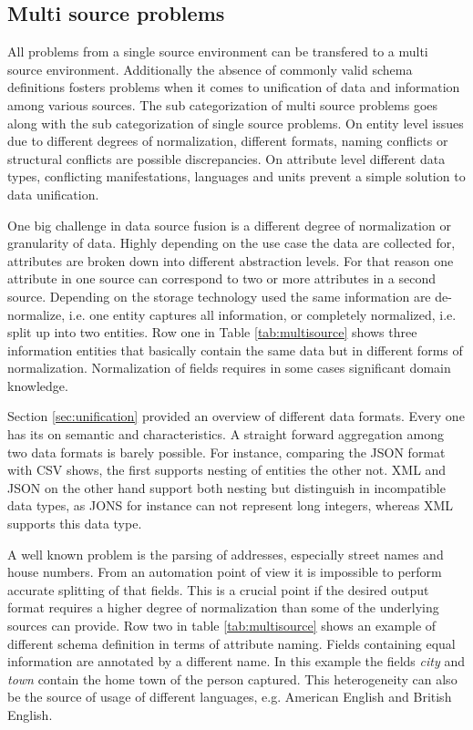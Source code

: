 \subsection{Multi source problems}
All problems from a single source environment can be transfered to a multi source environment. Additionally the absence of commonly valid schema definitions fosters problems when it comes to unification of data and information among various sources. The sub categorization of multi source problems goes along with the sub categorization of single source problems. On entity level issues due to different degrees of normalization, different formats, naming conflicts or structural conflicts are possible discrepancies. On attribute level different data types, conflicting manifestations, languages and units prevent a simple solution to data unification.

One big challenge in data source fusion is a different degree of normalization or granularity of data. Highly depending on the use case the data are collected for, attributes are broken down into different abstraction levels. For that reason one attribute in one source can correspond to two or more attributes in a second source. Depending on the storage technology used the same information are de-normalize, i.e. one entity captures all information, or completely normalized, i.e. split up into two entities. Row one in Table \ref{tab:multisource} shows three information entities that basically contain the same data but in different forms of normalization. Normalization of fields requires in some cases significant domain knowledge. 

Section \ref{sec:unification} provided an overview of different data formats. Every one has its on semantic and characteristics. A straight forward aggregation among two data formats is barely possible. For instance, comparing the JSON format with CSV shows, the first supports nesting of entities the other not. XML and JSON on the other hand support both nesting but distinguish in incompatible data types, as JONS for instance can not represent long integers, whereas XML supports this data type.

A well known problem is the parsing of addresses, especially street names and house numbers. From an automation point of view it is impossible to perform accurate splitting of that fields. This is a crucial point if the desired output format requires a higher degree of normalization than some of the underlying sources can provide. Row two in table \ref{tab:multisource} shows an example of different schema definition in terms of attribute naming. Fields containing equal information are annotated by a different name. In this example the fields \textit{city} and \textit{town} contain the home town of the person captured. This heterogeneity can also be the source of usage of different languages, e.g. American English and British English. 

